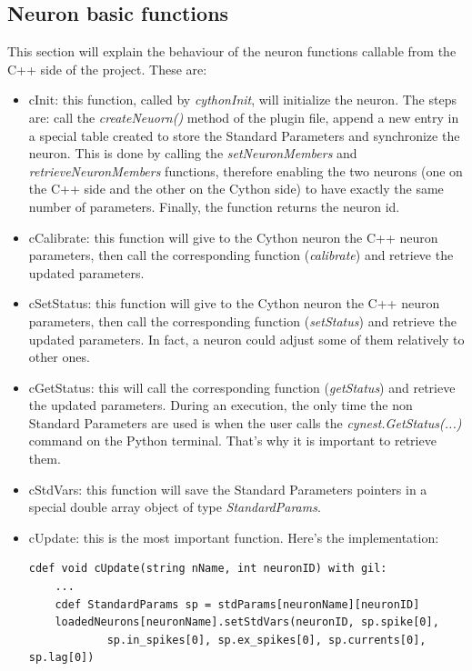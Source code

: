 \documentclass{article}
\begin{document}
\subsection{Neuron basic functions}
This section will explain the behaviour of the neuron functions callable from the C++ side of the project. These are:
\begin{itemize}
\item cInit: this function, called by \emph{cythonInit}, will initialize the neuron. The steps are:  call the \emph{createNeuorn()} method of the plugin file, append a new entry in a special table created to store the Standard Parameters and synchronize the neuron. This is done by calling the \emph{setNeuronMembers} and \emph{retrieveNeuronMembers} functions, therefore enabling the two neurons (one on the C++ side and the other on the Cython side) to have exactly the same number of parameters. Finally, the function returns the neuron id.

\item cCalibrate: this function will give to the Cython neuron the C++ neuron parameters, then call the corresponding function (\emph{calibrate}) and retrieve the updated parameters.


\item cSetStatus: this function will give to the Cython neuron the C++ neuron parameters, then call the corresponding function (\emph{setStatus}) and retrieve the updated parameters. In fact, a neuron could adjust some of them relatively to other ones.


\item cGetStatus: this will call the corresponding function (\emph{getStatus}) and retrieve the updated parameters. During an execution, the only time the non Standard Parameters are used is when the user calls the \emph{cynest.GetStatus(...)} command on the Python terminal. That's why it is important to retrieve them.


\item cStdVars: this function will save the Standard Parameters pointers in a special double array object of type \emph{StandardParams}.

\item cUpdate: this is the most important function. Here's the implementation:
\begin{verbatim}
cdef void cUpdate(string nName, int neuronID) with gil:
    ...
    cdef StandardParams sp = stdParams[neuronName][neuronID]
    loadedNeurons[neuronName].setStdVars(neuronID, sp.spike[0], 
    	    sp.in_spikes[0], sp.ex_spikes[0], sp.currents[0], sp.lag[0])


\end{verbatim}
\end{itemize}
\end{document}

